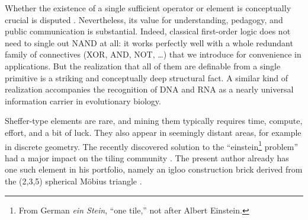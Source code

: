 \documentclass[12pt]{article}
\begin{document}
%
Whether the existence of a single sufficient operator or element is conceptually crucial is disputed 
\cite{Linsky2011EvolutionOfPrincipiaMathematica}. Nevertheless, its value for understanding, pedagogy, and public communication is substantial.
Indeed, classical first-order logic does not need to single out NAND at all: it works perfectly well with a whole redundant family of connectives (XOR, AND, NOT, \ldots) that we introduce for convenience in applications. But the realization that all of them are definable from a single primitive is a striking and conceptually deep structural fact. A similar kind of realization accompanies the recognition of DNA and RNA \cite{crickwatson1953implications} as a nearly universal information carrier in evolutionary biology. 





Sheffer-type elements are rare, and mining them typically requires time, compute, effort, and a bit of luck. They also appear in seemingly distant areas, for example in discrete geometry. The recently discovered solution to the “einstein\footnote{From German \textit{ein Stein}, “one tile,” not after Albert Einstein.} problem”
 had a major impact on the tiling community \cite{Einstein}. The present author already has one such element in his portfolio, namely an igloo construction brick derived from the (2,3,5) spherical M\"obius triangle \cite{DrHabIgloo}.
\end{document}
